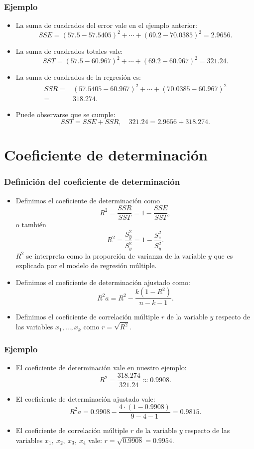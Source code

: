 \begin{frame}
\frametitle{Ejemplo}
\begin{itemize}
\item<2->{La suma de cuadrados del error vale en el ejemplo anterior:
$$
SSE =(57.5-57.5405)^2+\cdots +(69.2-70.0385)^2 = 2.9656.
$$}
\item<3->{La suma de cuadrados totales vale:
$$
SST=(57.5-60.967)^2+\cdots +(69.2-60.967)^2 = 321.24.
$$}
\item<4->{La suma de cuadrados de la regresión es:
$$
\begin{array}{rl}
SSR= & (57.5405-60.967)^2 +\cdots +(70.0385-60.967)^2 \\ 
= & 318.274.
\end{array}
$$}
\item<5->{Puede observarse que se cumple: 
$$
SST=SSE+SSR,\quad 321.24 = 2.9656 + 318.274.
$$}
\end{itemize}
\end{frame}


\section{Coeficiente de determinación}
\begin{frame}
\frametitle{Definición del coeficiente de determinación}
\begin{itemize}
\item<2->{Definimos el coeficiente de determinación como
$$R^2=\frac{SSR}{SST}=1-\frac{SSE}{SST},$$
o también
$$R^2=\frac{S^2_{\hat{y} }}{S^2_y}=1-\frac{S^2_e}{S^2_y}.$$
$R^2$  se interpreta como la proporción de varianza de la variable
$y$ que es explicada por el modelo de regresión múltiple.
}
\item<3->{Definimos el coeficiente de determinación ajustado como:
$$R^2a=R^2-\frac{k(1-R^2)}{n-k-1}.$$}
\item<4->{Definimos el coeficiente de correlación múltiple $r$ de la variable $y$ respecto de las variables $x_1,\ldots, x_k$ como $r=\sqrt{R^2}$.}
\end{itemize}
\end{frame}

\begin{frame}
\frametitle{Ejemplo}
\begin{itemize}
\item<2->{El coeficiente de determinación vale en nuestro ejemplo:
$$
R^2 = \frac{318.274}{321.24} \approx 0.9908.
$$}
\item<3->{El coeficiente de determinación ajustado vale:
$$
R^2a = 0.9908 -\frac{4\cdot (1-0.9908)}{9-4-1} = 0.9815.
$$}
\item<4->{El coeficiente de correlación múltiple $r$ de la variable $y$ respecto de las variables $x_1,\  x_2,\ x_3,\ x_4$ vale: $r=\sqrt{0.9908}=0.9954.$}
\end{itemize}
\end{frame}
